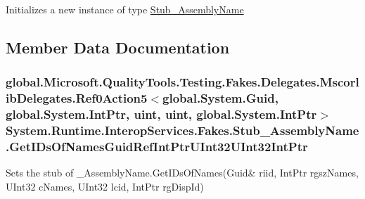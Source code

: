Initializes a new instance of type \hyperlink{class_system_1_1_runtime_1_1_interop_services_1_1_fakes_1_1_stub___assembly_name}{Stub\-\_\-\-Assembly\-Name}



\subsection{Member Data Documentation}
\hypertarget{class_system_1_1_runtime_1_1_interop_services_1_1_fakes_1_1_stub___assembly_name_af62ce86f08a0f9b45c0ef11dc9ed41b7}{
\subsubsection[{Get\-I\-Ds\-Of\-Names\-Guid\-Ref\-Int\-Ptr\-U\-Int32\-U\-Int32\-Int\-Ptr}]{\setlength{\rightskip}{0pt plus 5cm}global.\-Microsoft.\-Quality\-Tools.\-Testing.\-Fakes.\-Delegates.\-Mscorlib\-Delegates.\-Ref0\-Action5$<$global.\-System.\-Guid, global.\-System.\-Int\-Ptr, uint, uint, global.\-System.\-Int\-Ptr$>$ System.\-Runtime.\-Interop\-Services.\-Fakes.\-Stub\-\_\-\-Assembly\-Name.\-Get\-I\-Ds\-Of\-Names\-Guid\-Ref\-Int\-Ptr\-U\-Int32\-U\-Int32\-Int\-Ptr}}\label{class_system_1_1_runtime_1_1_interop_services_1_1_fakes_1_1_stub___assembly_name_af62ce86f08a0f9b45c0ef11dc9ed41b7}


Sets the stub of \-\_\-\-Assembly\-Name.\-Get\-I\-Ds\-Of\-Names(Guid\& riid, Int\-Ptr rgsz\-Names, U\-Int32 c\-Names, U\-Int32 lcid, Int\-Ptr rg\-Disp\-Id)

